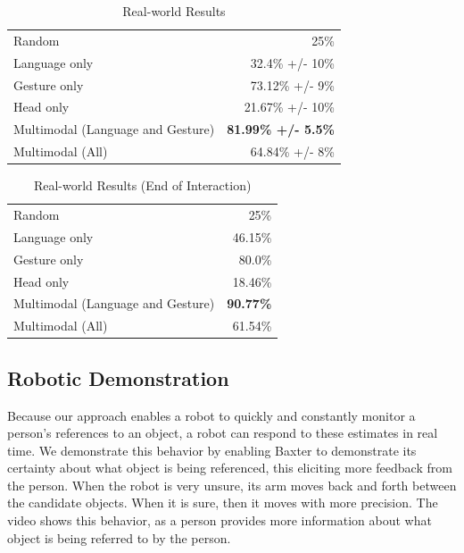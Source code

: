 \documentclass[letterpaper, 10 pt, conference]{ieeeconf}
\begin{document}
\begin{table}
\caption{Real-world Results\label{table:real_results}}
\centering
\begin{tabular}{lr}
\toprule
Random & 25\%\\
Language only &  32.4\% +/- 10\%\\
Gesture only  &  73.12\% +/- 9\%\\
Head only     &  21.67\% +/- 10\%\\
Multimodal (Language and Gesture) & {\bf 81.99\% +/- 5.5\%}\\
Multimodal (All) &  64.84\% +/- 8\%\\
\bottomrule
\end{tabular}
\end{table}
\begin{table}
\caption{Real-world Results (End of Interaction)\label{table:end_real}}
\centering
\begin{tabular}{lr}
\toprule
Random & 25\%\\
Language only &  46.15\%\\
Gesture only  &  80.0\%\\
Head only     & 18.46\%\\
Multimodal (Language and Gesture) & {\bf 90.77\%}\\
Multimodal (All) &  61.54\%\\
\bottomrule
\end{tabular}
\end{table}

\subsection{Robotic Demonstration}

Because our approach enables a robot to quickly and constantly monitor
a person's references to an object, a robot can respond to these
estimates in real time.  We demonstrate this behavior by enabling
Baxter to demonstrate its certainty about what object is being
referenced, this eliciting more feedback from the person.  When the
robot is very unsure, its arm moves back and forth between the
candidate objects.  When it is sure, then it moves with more
precision.  The video shows this behavior, as a person provides more
information about what object is being referred to by the person.
\end{document}
